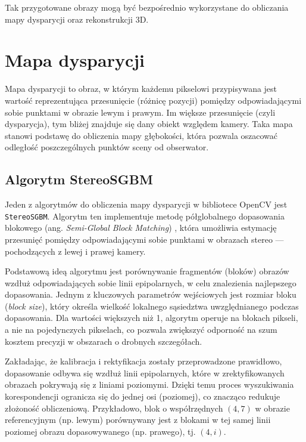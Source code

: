 \documentclass[magisterska]{pracadypl}
\begin{document}
Tak przygotowane obrazy mogą być bezpośrednio wykorzystane do obliczania mapy dysparycji oraz rekonstrukcji 3D.

\section{Mapa dysparycji}

Mapa dysparycji \cite{disparity} to obraz, w którym każdemu pikselowi przypisywana jest wartość reprezentująca przesunięcie (różnicę pozycji) pomiędzy odpowiadającymi sobie punktami w obrazie lewym i prawym. Im większe przesunięcie (czyli dysparycja), tym bliżej znajduje się dany obiekt względem kamery. Taka mapa stanowi podstawę do obliczenia mapy głębokości, która pozwala oszacować odległość poszczególnych punktów sceny od obserwator.

\subsection{Algorytm StereoSGBM}

Jeden z algorytmów do obliczenia mapy dysparycji w bibliotece OpenCV jest \texttt{StereoSGBM}. Algorytm ten implementuje metodę półglobalnego dopasowania blokowego (ang. \textit{Semi-Global Block Matching}) \cite{semi-global}, która umożliwia estymację przesunięć pomiędzy odpowiadającymi sobie punktami w obrazach stereo — pochodzących z lewej i prawej kamery.

Podstawową ideą algorytmu jest porównywanie fragmentów (bloków) obrazów wzdłuż odpowiadających sobie linii epipolarnych, w celu znalezienia najlepszego dopasowania. Jednym z kluczowych parametrów wejściowych jest rozmiar bloku (\textit{block size}), który określa wielkość lokalnego sąsiedztwa uwzględnianego podczas dopasowania. Dla wartości większych niż 1, algorytm operuje na blokach pikseli, a nie na pojedynczych pikselach, co pozwala zwiększyć odporność na szum kosztem precyzji w obszarach o drobnych szczegółach.

Zakładając, że kalibracja i rektyfikacja zostały przeprowadzone prawidłowo, dopasowanie odbywa się wzdłuż linii epipolarnych, które w zrektyfikowanych obrazach pokrywają się z liniami poziomymi. Dzięki temu proces wyszukiwania korespondencji ogranicza się do jednej osi (poziomej), co znacząco redukuje złożoność obliczeniową. Przykładowo, blok o współrzędnych $(4,7)$ w obrazie referencyjnym (np. lewym) porównywany jest z blokami w tej samej linii poziomej obrazu dopasowywanego (np. prawego), tj. $(4,i)$.
\end{document}
